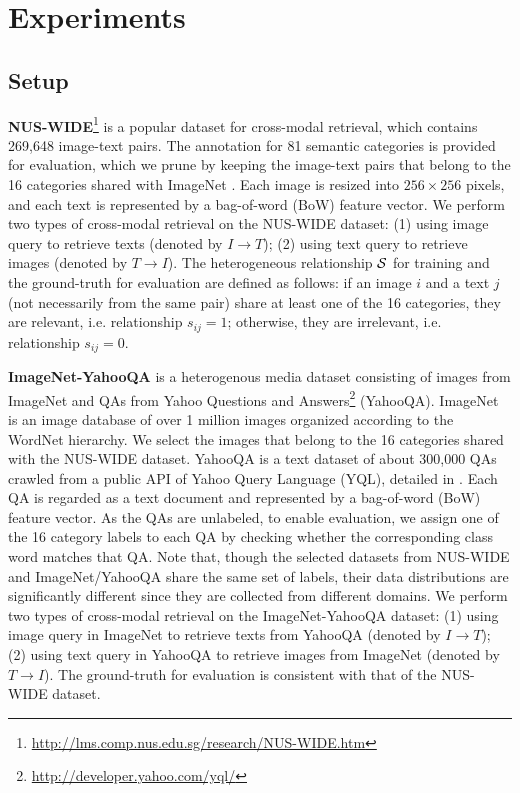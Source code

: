 \documentclass{article}
\begin{document}
\section{Experiments}\label{section:Experiments}

\subsection{Setup}
\textbf{NUS-WIDE}\footnote{\url{http://lms.comp.nus.edu.sg/research/NUS-WIDE.htm}} is a popular dataset for cross-modal retrieval, which contains 269,648 image-text pairs. The annotation for 81 semantic categories is provided for evaluation, which we prune by keeping the image-text pairs that belong to the 16 categories shared with ImageNet \cite{cite:IMAGENET}. Each image is resized into $256 \times 256$ pixels, and each text is represented by a bag-of-word (BoW) feature vector. We perform two types of cross-modal retrieval on the NUS-WIDE dataset: (1) using image query to retrieve texts (denoted by $I \rightarrow T$); (2) using text query to retrieve images (denoted by $T \rightarrow I$). The heterogeneous relationship ${\cal S}$ for training and the ground-truth for evaluation are defined as follows: if an image $i$ and a text $j$ (not necessarily from the same pair) share at least one of the 16 categories, they are relevant, i.e. relationship $s_{ij}=1$; otherwise, they are irrelevant, i.e. relationship $s_{ij}=0$.

\textbf{ImageNet-YahooQA} \cite{cite:KDD14HTH} is a heterogenous media dataset consisting of images from ImageNet \cite{cite:IMAGENET} and QAs from Yahoo Questions and Answers\footnote{\url{http://developer.yahoo.com/yql/}} (YahooQA). ImageNet is an image database of over 1 million images organized according to the WordNet hierarchy. We select the images that belong to the 16 categories shared with the NUS-WIDE dataset.  YahooQA is a text dataset of about 300,000 QAs crawled from a public API of Yahoo Query Language (YQL), detailed in \cite{cite:KDD14HTH}. Each QA is regarded as a text document and represented by a bag-of-word (BoW) feature vector. As the QAs are unlabeled, to enable evaluation, we assign one of the 16 category labels to each QA by checking whether the corresponding class word matches that QA. Note that, though the selected datasets from NUS-WIDE and ImageNet/YahooQA share the same set of labels, their data distributions are significantly different since they are collected from different domains. We perform two types of cross-modal retrieval on the ImageNet-YahooQA dataset: (1) using image query in ImageNet to retrieve texts from YahooQA (denoted by $I \rightarrow T$); (2) using text query in YahooQA to retrieve images from ImageNet (denoted by $T \rightarrow I$). The ground-truth for evaluation is consistent with that of the NUS-WIDE dataset.
\end{document}
